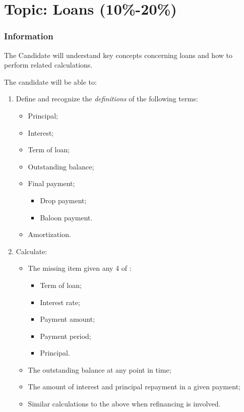 \chapter[Topic: Loans]{Topic: Loans (10\%-20\%)}

\subsection{Information}

\begin{distributions}[Objective]
The Candidate will understand key concepts concerning loans and how to perform related calculations.
\end{distributions}

\begin{outcomes}
The candidate will be able to:
\begin{enumerate}[label = \alph*), leftmargin = *]
	\item	Define and recognize the \textit{definitions} of the following terms:
		\begin{itemize}[leftmargin = *]
		\item	Principal;
		\item	Interest;
		\item	Term of loan;
		\item	Outstanding balance;
		\item	Final payment;
			\begin{itemize}[leftmargin = *]
			\item	Drop payment;
			\item	Baloon payment.
			\end{itemize}
		\item	Amortization.
		\end{itemize}
	\item	Calculate:
		\begin{itemize}[leftmargin = *]
		\item	The missing item given any 4 of :
			\begin{itemize}[leftmargin = *]
			\item	Term of loan;
			\item	Interest rate;
			\item	Payment amount;
			\item	Payment period;
			\item	Principal.
			\end{itemize}
		\item	The outstanding balance at any point in time;
		\item	The amount of interest and principal repayment in a given payment;
		\item	Similar calculations to the above when refinancing is involved.
		\end{itemize}
\end{enumerate}
\end{outcomes}

